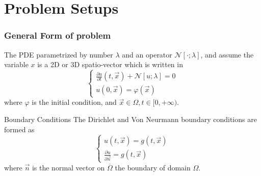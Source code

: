 \section{Problem Setups}


\begin{frame}
  \frametitle{General Form of problem}
  \begin{block}{}
    The PDE parametrized by number $\lambda$ and an operator $\mathcal{N}[\cdot; \lambda]$, 
    and assume the variable $x$ is a 2D or 3D spatio-vector which is written in 
    \begin{equation}
      \begin{cases}
        \displaystyle \frac{\partial u}{\partial t}\left(t,\vec{x}\right) + \mathcal{N}\left[u;\lambda\right] = 0 \\
        \displaystyle u\left(0,\vec{x}\right) = \varphi (\vec{x})
      \end{cases}
    \end{equation}
    where $\varphi$ is the initial condition, and $\vec{x}\in \Omega, t\in[0, +\infty)$.
  \end{block}


  \begin{block}{Boundary Conditions}
    The Dirichlet and Von Neurmann boundary conditions are formed as 
    \begin{equation}
      \begin{cases}
        \displaystyle u\left(t,\vec{x}\right) = g (t,\vec{x}) \\
        \displaystyle \frac{\partial u}{\partial \vec{n}} = g (t,\vec{x})  
      \end{cases}
    \end{equation}
    where $\vec{n}$ is the normal vector on $\overline{\Omega}$ the boundary of domain $\Omega$.
  \end{block}
\end{frame}



